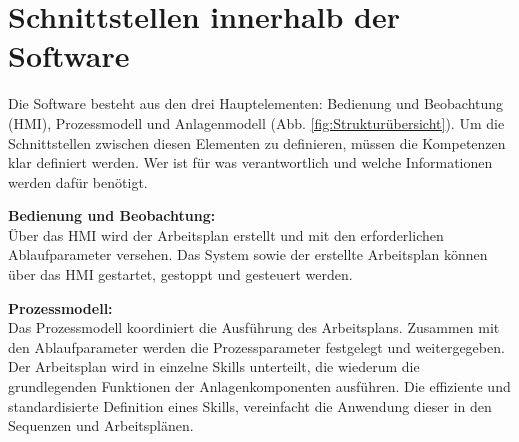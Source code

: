 \section{Schnittstellen innerhalb der Software} \label{Softwareschnittstellen}

	Die Software besteht aus den drei Hauptelementen: Bedienung und Beobachtung (HMI), Prozessmodell und Anlagenmodell (Abb. \ref{fig:Strukturübersicht}). Um die Schnittstellen zwischen diesen Elementen zu definieren, müssen die Kompetenzen klar definiert werden. Wer ist für was verantwortlich und welche Informationen werden dafür benötigt. 
	
	\textbf{Bedienung und Beobachtung:}
	\vspace{2mm} 
	\\
	Über das HMI wird der Arbeitsplan erstellt und mit den erforderlichen Ablaufparameter versehen. Das System sowie der erstellte Arbeitsplan können über das HMI gestartet, gestoppt und gesteuert werden.
	
	\textbf{Prozessmodell:}
	\vspace{2mm} 
	\\
	Das Prozessmodell koordiniert die Ausführung des Arbeitsplans. Zusammen mit den Ablaufparameter werden die Prozessparameter festgelegt und weitergegeben. Der Arbeitsplan wird in einzelne Skills unterteilt, die wiederum die grundlegenden Funktionen der Anlagenkomponenten ausführen. Die effiziente und standardisierte Definition eines Skills, vereinfacht die Anwendung dieser in den Sequenzen und Arbeitsplänen.
	
	\newpage
	
